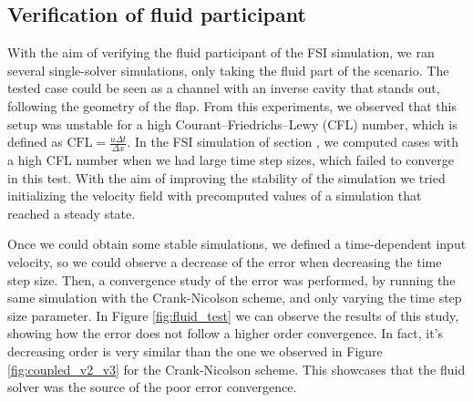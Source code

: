 \documentclass[
  english,        %
  font=times,     %
  onecolumn,      %
]{tumarticle}
\begin{document}
\subsection{Verification of fluid participant} \label{sec:fluid-part}
With the aim of verifying the fluid participant of the FSI simulation, we ran several single-solver simulations, only taking the fluid part of the scenario. The tested case could be seen as a channel with an inverse cavity that stands out, following the geometry of the flap. From this experiments, we observed that this setup was unstable for a high Courant–Friedrichs–Lewy (CFL) number, which is defined as $\text{CFL} = \frac{u \Delta t}{\Delta x}$. In the FSI simulation of section \label{sec:FSI}, we computed cases with a high CFL number when we had large time step sizes, which failed to converge in this test. With the aim of improving the stability of the simulation we tried initializing the velocity field with precomputed values of a simulation that reached a steady state.

Once we could obtain some stable simulations, we defined a time-dependent input velocity, so we could observe a decrease of the error when decreasing the time step size. Then, a convergence study of the error was performed, by running the same simulation with the Crank-Nicolson scheme, and only varying the time step size parameter. In Figure \ref{fig:fluid_test} we can observe the results of this study, showing how the error does not follow a higher order convergence. In fact, it's decreasing order is very similar than the one we observed in Figure \ref{fig:coupled_v2_v3} for the Crank-Nicolson scheme. This showcases that the fluid solver was the source of the poor error convergence.


\end{document}

